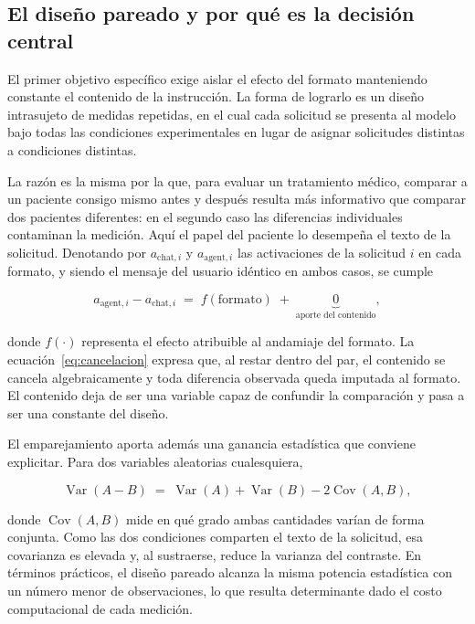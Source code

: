 \subsection{El diseño pareado y por qué es la decisión central}

El primer objetivo específico exige aislar el efecto del formato manteniendo
constante el contenido de la instrucción. La forma de lograrlo es un diseño
intrasujeto de medidas repetidas, en el cual cada solicitud se presenta al
modelo bajo todas las condiciones experimentales en lugar de asignar
solicitudes distintas a condiciones distintas.

La razón es la misma por la que, para evaluar un tratamiento médico, comparar a
un paciente consigo mismo antes y después resulta más informativo que comparar
dos pacientes diferentes: en el segundo caso las diferencias individuales
contaminan la medición. Aquí el papel del paciente lo desempeña el texto de la
solicitud. Denotando por $a_{\text{chat},i}$ y $a_{\text{agent},i}$ las
activaciones de la solicitud $i$ en cada formato, y siendo el mensaje del
usuario idéntico en ambos casos, se cumple

\begin{equation}
  a_{\text{agent},i} - a_{\text{chat},i}
  \;=\;
  f(\text{formato}) \;+\; \underbrace{0}_{\text{aporte del contenido}},
  \label{eq:cancelacion}
\end{equation}

\noindent
donde $f(\cdot)$ representa el efecto atribuible al andamiaje del formato. La
ecuación~\eqref{eq:cancelacion} expresa que, al restar dentro del par, el
contenido se cancela algebraicamente y toda diferencia observada queda
imputada al formato. El contenido deja de ser una variable capaz de confundir
la comparación y pasa a ser una constante del diseño.

El emparejamiento aporta además una ganancia estadística que conviene explicitar.
Para dos variables aleatorias cualesquiera,

\begin{equation}
  \operatorname{Var}(A - B)
  \;=\;
  \operatorname{Var}(A) + \operatorname{Var}(B) - 2\operatorname{Cov}(A,B),
  \label{eq:varianza-diferencia}
\end{equation}

\noindent
donde $\operatorname{Cov}(A,B)$ mide en qué grado ambas cantidades varían de
forma conjunta. Como las dos condiciones comparten el texto de la solicitud,
esa covarianza es elevada y, al sustraerse, reduce la varianza del contraste.
En términos prácticos, el diseño pareado alcanza la misma potencia estadística
con un número menor de observaciones, lo que resulta determinante dado el costo
computacional de cada medición.

